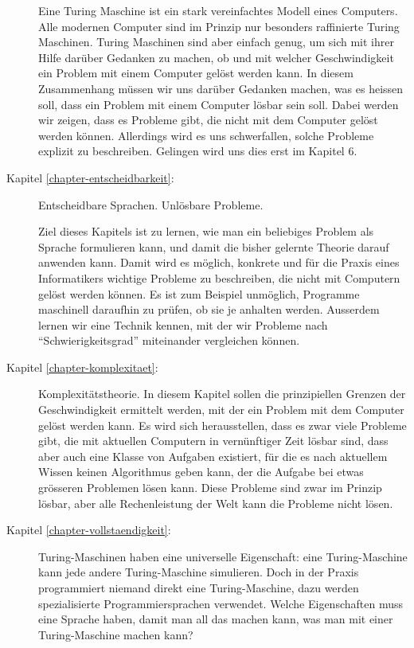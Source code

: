 \begin{description}
Eine Turing Maschine ist ein stark vereinfachtes Modell eines Computers.
Alle modernen Computer sind im Prinzip nur besonders raffinierte Turing Maschinen.
Turing Maschinen sind aber einfach genug, um sich mit ihrer Hilfe darüber Gedanken
zu machen, ob und mit welcher Geschwindigkeit ein Problem mit einem
Computer gelöst werden kann.
In diesem Zusammenhang müssen wir uns
darüber Gedanken machen, was es heissen soll, dass ein Problem mit
einem Computer lösbar sein soll.
Dabei werden wir zeigen, dass es Probleme
gibt, die nicht mit dem Computer gelöst werden können.
Allerdings wird
es uns schwerfallen, solche Probleme explizit zu beschreiben.
Gelingen wird uns dies erst im Kapitel 6.

\item[Kapitel \ref{chapter-entscheidbarkeit}:] Entscheidbare Sprachen.
Unlösbare Probleme.

Ziel dieses Kapitels ist zu lernen, wie man ein beliebiges Problem als
Sprache formulieren kann, und damit die bisher gelernte Theorie darauf
anwenden kann.
Damit wird es möglich, konkrete und für die Praxis eines
Informatikers wichtige Probleme zu beschreiben, die
nicht mit Computern gelöst werden können.
Es ist zum Beispiel unmöglich, Programme maschinell daraufhin
zu prüfen, ob sie je anhalten werden.
Ausserdem lernen wir eine Technik kennen, mit der wir Probleme 
nach ``Schwierigkeitsgrad'' miteinander vergleichen können.

\item[Kapitel \ref{chapter-komplexitaet}:] Komplexitätstheorie.
In diesem Kapitel sollen 
die prinzipiellen Grenzen der Geschwindigkeit ermittelt werden,
mit der ein Problem mit dem Computer gelöst werden kann.
Es wird sich
herausstellen, dass es zwar viele Probleme gibt, die mit aktuellen Computern in
vernünftiger Zeit lösbar sind, dass aber auch eine Klasse von Aufgaben
existiert, für die es nach aktuellem Wissen keinen Algorithmus geben kann,
der die Aufgabe bei etwas grösseren Problemen lösen kann.
Diese Probleme sind
zwar im Prinzip lösbar, aber alle Rechenleistung der Welt kann die Probleme nicht lösen.

\item[Kapitel \ref{chapter-vollstaendigkeit}:]
Turing-Maschinen haben eine universelle Eigenschaft: eine Turing-Maschine
kann jede andere Turing-Maschine simulieren.
Doch in der Praxis
programmiert niemand direkt eine Turing-Maschine, dazu werden
spezialisierte Programmiersprachen verwendet.
Welche Eigenschaften muss eine Sprache haben, damit
man all das machen kann, was man mit einer Turing-Maschine
machen kann?
\end{description}


